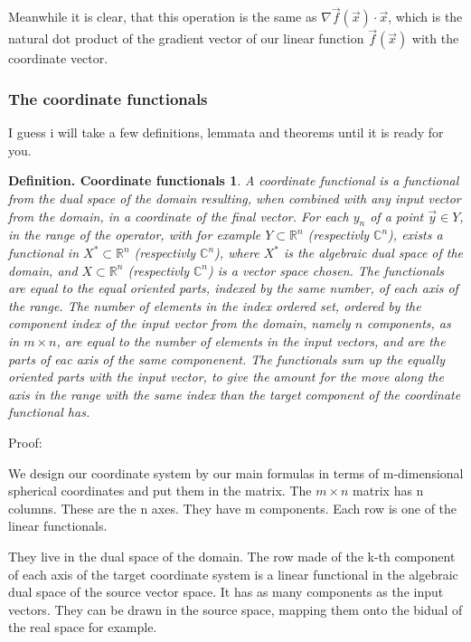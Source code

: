 \documentclass[a4paper]{article}
\begin{document}
Meanwhile it is clear, that this operation is the same as $\nabla\vec{f}(\vec{x}) \cdot \vec{x}$, which is the natural dot product of the gradient vector of our linear function $\vec{f}(\vec{x})$ with the coordinate vector.


\subsubsection{The coordinate functionals}

I guess i will take a few definitions, lemmata and theorems until it is ready for you.

\newtheorem{coordinatefunctional}{Definition. Coordinate functionals}
\begin{coordinatefunctional}
A coordinate functional is a functional from the dual space of the domain resulting, when combined with any input vector from the domain, in a coordinate of the final vector. For each $y_n$ of a point $\vec{y} \in Y$, in the range of the operator, with for example $Y \subset \mathbb{R}^{n}$ (respectivly $\mathbb{C}^{n}$), exists a functional in $X^{*} \subset \mathbb{R}^{n}$ (respectivly $\mathbb{C}^{n}$), where $X^{*}$ is the algebraic dual space of the domain, and $X \subset \mathbb{R}^{n}$ (respectivly $\mathbb{C}^{n}$) is a vector space chosen. The functionals are equal to the equal oriented parts, indexed by the same number, of each axis of the range. The number of elements in the index ordered set, ordered by the component index of the input vector from the domain, namely $n$ components, as in $m \times n$, are equal to the number of elements in the input vectors, and are the parts of eac axis of the same componenent. The functionals sum up the equally oriented parts with the input vector, to give the amount for the move along the axis in the range with the same index than the target component of the coordinate functional has.
\end{coordinatefunctional}

Proof:

We design our coordinate system by our main formulas in terms of m-dimensional spherical coordinates and put them in the matrix.
The $m \times n$ matrix has n columns. These are the n axes. They have m components. Each row is one of the linear functionals.

They live in the dual space of the domain. The row made of the k-th component of each axis of the target coordinate system is a linear functional in the algebraic dual space of the source vector space. It has as many components as the input vectors. They can be drawn in the source space, mapping them onto the bidual of the real space for example.
\end{document}
